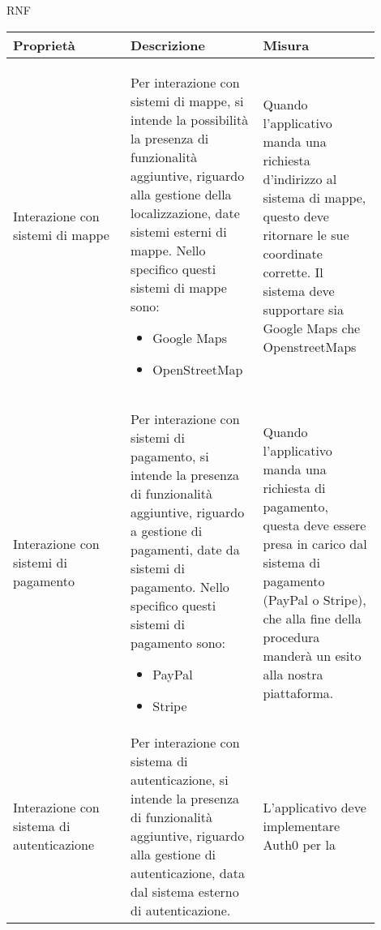 \begin{listaPersonale}{RNF}
    \begin{tabular}{|p{0.3\linewidth}|p{0.3\linewidth}|p{0.3\linewidth}|}
        \hline
        \rowcolor{viola} \textbf{Proprietà}                     &
        \textbf{Descrizione}                                    &
        \textbf{Misura}                                           \\
        \hline
        Interazione con sistemi di mappe                        &
        Per interazione con sistemi di mappe, si intende la
        possibilità la presenza di funzionalità aggiuntive,
        riguardo alla gestione della localizzazione, date
        sistemi esterni di mappe. Nello specifico questi
        sistemi di mappe sono:
        \begin{itemize}
            \item Google Maps
            \item OpenStreetMap
        \end{itemize}                                     &
        Quando l'applicativo manda una richiesta d'indirizzo
        al sistema di mappe, questo deve ritornare le sue
        coordinate corrette. Il sistema deve supportare sia
        Google Maps che OpenstreetMaps                            \\
        \hline
        Interazione con sistemi di pagamento                    &
        Per interazione con sistemi di pagamento, si intende
        la presenza di funzionalità aggiuntive, riguardo a
        gestione di pagamenti, date da sistemi di pagamento.
        Nello specifico questi sistemi di pagamento sono:
        \begin{itemize}
            \item PayPal
            \item Stripe
        \end{itemize}                                         &
        Quando l'applicativo manda una richiesta di pagamento,
        questa deve essere presa in carico dal sistema di
        pagamento (PayPal o Stripe), che alla fine della
        procedura manderà un esito alla nostra piattaforma.       \\
        \hline
        Interazione con sistema di autenticazione               &
        Per interazione con sistema di autenticazione,
        si intende la presenza di funzionalità aggiuntive,
        riguardo alla gestione di autenticazione,
        data dal sistema esterno di autenticazione.             &
        L'applicativo deve implementare Auth0 per la

\end{tabular}
\end{listaPersonale}
